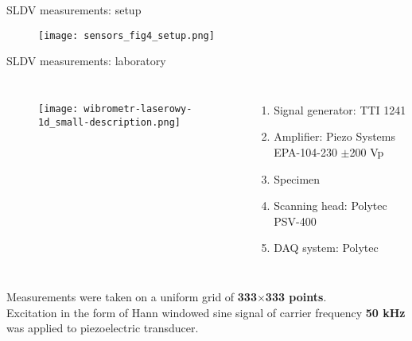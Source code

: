 \documentclass[10pt,aspectratio=169,dvipsnames]{beamer} %
\begin{document}
		\begin{frame}[t]{SLDV measurements: setup}
			\begin{figure}
				\texttt{[image: sensors\_fig4\_setup.png]}
			\end{figure}
		\end{frame}
		\begin{frame}[t]{SLDV measurements: laboratory}
			\begin{columns}[T]
				\begin{figure}
					\texttt{[image: wibrometr-laserowy-1d\_small-description.png]}
				\end{figure}
				\begin{enumerate}
					\item Signal generator: TTI 1241 
					\item Amplifier: Piezo Systems EPA-104-230 $\pm$200 Vp
					\item Specimen
					\item Scanning head: Polytec PSV-400
					\item DAQ system: Polytec
				\end{enumerate}
			\end{columns}
			{\small
				Measurements were taken on a uniform grid of \textbf{333$\times$333 points}.\\
				Excitation in the form of Hann windowed sine signal of carrier frequency \textbf{50 kHz} was applied to piezoelectric transducer.}
		\end{frame}
		
	
\end{document}
